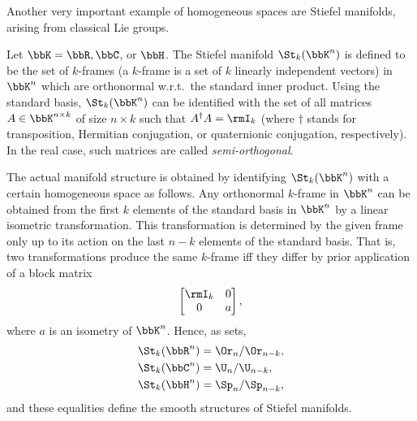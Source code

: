 Another very important example of homogeneous spaces are Stiefel manifolds, arising from classical Lie groups.

\begin{defn}\label{def stiefel manifolds}
    Let $\bbK=\bbR,\bbC$, or $\bbH$. The Stiefel manifold $\St_k(\bbK^n)$ is defined to be the set of $k$-frames (a $k$-frame is a set of $k$ linearly independent vectors) in $\bbK^n$ which are orthonormal w.r.t.\ the standard inner product. Using the standard basis, $\St_k(\bbK^n)$ can be identified with the set of all matrices $A\in \bbK^{n\times k}$ of size $n\times k$ such that $A^\dagger A=\rmI_k$ (where $\dagger$ stands for transposition, Hermitian conjugation, or quaternionic conjugation, respectively). In the real case, such matrices are called \emph{semi-orthogonal}. 
    
    The actual manifold structure is obtained by identifying $\St_k(\bbK^n)$ with a certain homogeneous space as follows. Any orthonormal $k$-frame in $\bbK^n$ can be obtained from the first $k$ elements of the standard basis in $\bbK^n$ by a linear isometric transformation. This transformation is determined by the given frame only up to its action on the last $n-k$ elements of the standard basis. That is, two transformations produce the same $k$-frame iff they differ by prior application of a block matrix 
    \[\begin{bmatrix}
        \rmI_k&0\\0&a
    \end{bmatrix}, \]
    where $a$ is an isometry of $\bbK^n$. Hence, as sets,
    \begin{align}
        \St_k(\bbR^n)&=\Or_n\slash \Or_{n-k},\\
        \St_k(\bbC^n)&=\U_n\slash \U_{n-k},\\
        \St_k(\bbH^n)&=\Sp_n\slash \Sp_{n-k},
    \end{align}
    and these equalities define the smooth structures of Stiefel manifolds.
\end{defn}
